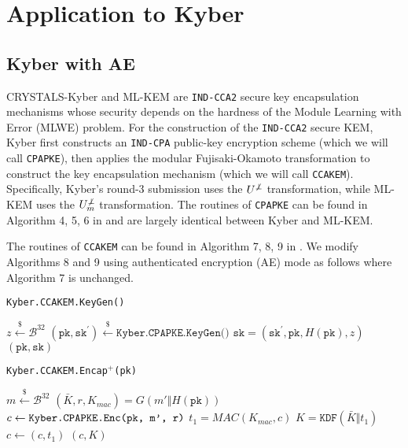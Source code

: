 \documentclass[floatrow,journal=tches,submission]{iacrtrans}
\newcommand{\pk}{\texttt{pk}}
\newcommand{\sk}{\texttt{sk}}
\newcommand{\leftsample}{\stackrel{\$}{\leftarrow}}
\begin{document}
\section{Application to Kyber}

\subsection{Kyber with AE}
CRYSTALS-Kyber \cite{bos2018crystals}\cite{avanzi2019crystals} and ML-KEM \cite{key2023mechanism} are \texttt{IND-CCA2} secure key encapsulation mechanisms whose security depends on the hardness of the Module Learning with Error (MLWE) problem. For the construction of the \texttt{IND-CCA2} secure KEM, Kyber first constructs an \texttt{IND-CPA} public-key encryption scheme (which we will call \texttt{CPAPKE}), then applies the modular Fujisaki-Okamoto transformation \cite{hofheinz2017modular} to construct the key encapsulation mechanism (which we will call \texttt{CCAKEM}). Specifically, Kyber's round-3 submission uses the $U^{\not\bot}$ transformation, while ML-KEM uses the $U^{\not\bot}_m$ transformation. The routines of \texttt{CPAPKE} can be found in Algorithm 4, 5, 6 in \cite{avanzi2019crystals} and are largely identical between Kyber and ML-KEM. 

The routines of \texttt{CCAKEM} can be found in Algorithm 7, 8, 9 in \cite{avanzi2019crystals}. We modify Algorithms 8 and 9 using authenticated encryption (AE)  mode as follows where Algorithm 7 is unchanged.

\begin{algorithm}[H]
    \caption{\texttt{Kyber.CCAKEM.KeyGen()}}
    \begin{algorithmic}[1]
        \State $z \leftsample \mathcal{B}^{32}$
        \State $(\pk, \sk^\prime) \leftsample \texttt{Kyber.CPAPKE.KeyGen()}$
        \State $\sk = (\sk^\prime, \pk, H(\pk), z)$
        \State \Return $(\pk, \sk)$
    \end{algorithmic}
\end{algorithm}

\begin{algorithm}[H]
    \caption{\texttt{Kyber.CCAKEM.Encap$^+$(\pk)}}
    \begin{algorithmic}[1]
        \State $m \leftsample \mathcal{B}^{32}$
        \State $(\bar{K}, r, K_{mac}) = G(m' \Vert H(\pk))$
        \State $c  \leftarrow \texttt{Kyber.CPAPKE.Enc(\pk, m', r)}$
            \State $t_1=MAC(K_{mac}, c)$
        \State $K = \texttt{KDF}(\bar{K} \Vert t_1)$
        \State $c \leftarrow (c, t_1)$
        \State \Return $(c, K)$
    \end{algorithmic}
\end{algorithm}
\end{document}

